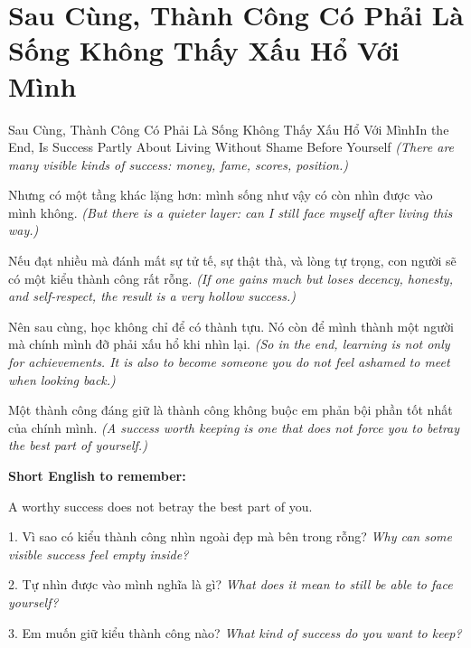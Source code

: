 \section{Sau Cùng, Thành Công Có Phải Là Sống Không Thấy Xấu Hổ Với Mình}
\begin{truyen}{Sau Cùng, Thành Công Có Phải Là Sống Không Thấy Xấu Hổ Với Mình}{In the End, Is Success Partly About Living Without Shame Before Yourself}
\textit{(There are many visible kinds of success: money, fame, scores, position.)}

Nhưng có một tầng khác lặng hơn: mình sống như vậy có còn nhìn được vào mình không.
\textit{(But there is a quieter layer: can I still face myself after living this way.)}

Nếu đạt nhiều mà đánh mất sự tử tế, sự thật thà, và lòng tự trọng, con người sẽ có một kiểu thành công rất rỗng.
\textit{(If one gains much but loses decency, honesty, and self-respect, the result is a very hollow success.)}

Nên sau cùng, học không chỉ để có thành tựu. Nó còn để mình thành một người mà chính mình đỡ phải xấu hổ khi nhìn lại.
\textit{(So in the end, learning is not only for achievements. It is also to become someone you do not feel ashamed to meet when looking back.)}
\end{truyen}

\begin{baihoc}
Một thành công đáng giữ là thành công không buộc em phản bội phần tốt nhất của chính mình.
\textit{(A success worth keeping is one that does not force you to betray the best part of yourself.)}
\end{baihoc}

\begin{ghinhoanh}
\textbf{Short English to remember:}

A worthy success does not betray the best part of you.

\end{ghinhoanh}

\begin{tuhocnhanh}
1. Vì sao có kiểu thành công nhìn ngoài đẹp mà bên trong rỗng? \textit{Why can some visible success feel empty inside?}

2. Tự nhìn được vào mình nghĩa là gì? \textit{What does it mean to still be able to face yourself?}

3. Em muốn giữ kiểu thành công nào? \textit{What kind of success do you want to keep?}
\end{tuhocnhanh}
\ngancach

